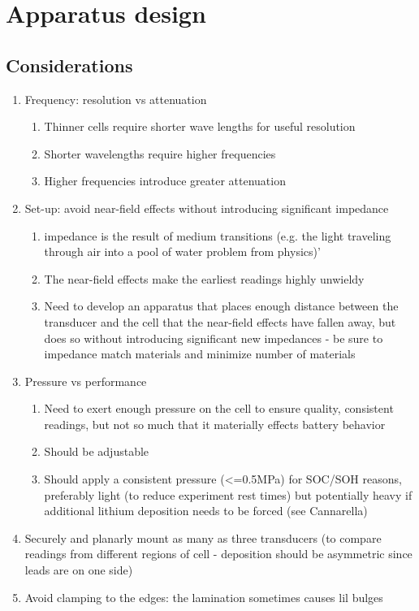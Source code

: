 \chapter{Apparatus design}

\section{Considerations}
\begin{enumerate}
    \item Frequency: resolution vs attenuation
    \begin{enumerate}
        \item Thinner cells require shorter wave lengths for useful resolution
	    \item Shorter wavelengths require higher frequencies
		\item Higher frequencies introduce greater attenuation
	\end{enumerate}
	\item Set-up: avoid near-field effects without introducing significant impedance
		\begin{enumerate} 
		    \item impedance is the result of medium transitions (e.g. the light traveling through air into a pool of water problem from physics)'
		    \item The near-field effects make the earliest readings highly unwieldy
	        \item Need to develop an apparatus that places enough distance between the transducer and the cell that the near-field effects have fallen away, but does so without introducing significant new impedances - be sure to impedance match materials and minimize number of materials
	    \end{enumerate}
	\item Pressure vs performance
	    \begin{enumerate}
		\item Need to exert enough pressure on the cell to ensure quality, consistent readings, but not so much that it materially effects battery behavior
		\item Should be adjustable
		\item Should apply a consistent pressure (<=0.5MPa) for SOC/SOH reasons, preferably light (to reduce experiment rest times) but potentially heavy if additional lithium deposition needs to be forced (see Cannarella)
		\end{enumerate}
    \item Securely and planarly mount as many as three transducers (to compare readings from different regions of cell - deposition should be asymmetric since leads are on one side)
    \item Avoid clamping to the edges: the lamination sometimes causes lil bulges
\end{enumerate}

